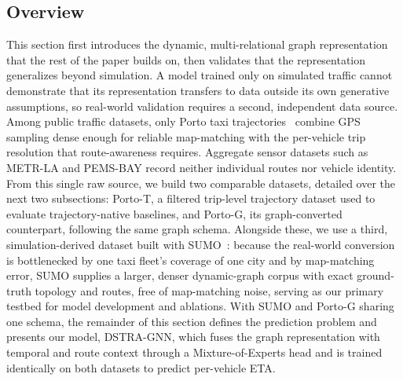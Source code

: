 \documentclass[pdflatex,sn-basic,Numbered]{sn-jnl}%
\begin{document}
\subsection{Overview}\label{sec:methodology-overview}
This section first introduces the dynamic, multi-relational graph representation that the rest of the paper builds on, then validates that the representation generalizes beyond simulation. A model trained only on simulated traffic cannot demonstrate that its representation transfers to data outside its own generative assumptions, so real-world validation requires a second, independent data source. Among public traffic datasets, only Porto taxi trajectories~\cite{moreira2013porto} combine GPS sampling dense enough for reliable map-matching with the per-vehicle trip resolution that route-awareness requires. Aggregate sensor datasets such as METR-LA and PEMS-BAY record neither individual routes nor vehicle identity. From this single raw source, we build two comparable datasets, detailed over the next two subsections: Porto-T, a filtered trip-level trajectory dataset used to evaluate trajectory-native baselines, and Porto-G, its graph-converted counterpart, following the same graph schema. Alongside these, we use a third, simulation-derived dataset built with SUMO~\cite{SUMO2018}: because the real-world conversion is bottlenecked by one taxi fleet's coverage of one city and by map-matching error, SUMO supplies a larger, denser dynamic-graph corpus with exact ground-truth topology and routes, free of map-matching noise, serving as our primary testbed for model development and ablations. With SUMO and Porto-G sharing one schema, the remainder of this section defines the prediction problem and presents our model, DSTRA-GNN, which fuses the graph representation with temporal and route context through a Mixture-of-Experts head and is trained identically on both datasets to predict per-vehicle ETA.
\end{document}
